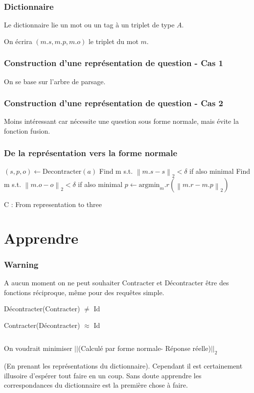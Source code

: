 \documentclass{beamer}
\newcommand{\N}[1]{\left\|#1\right\|_2}
\begin{document}
\begin{frame}
\frametitle{Dictionnaire}

\begin{defi}
Le dictionnaire lie un mot ou un tag à un triplet de type $A$.

On écrira $(m.s,m.p,m.o)$ le triplet du mot $m$.
\end{defi}
\end{frame}

\begin{frame}
\frametitle{Construction d'une représentation de question - Cas 1}
\parseroutput

On se base sur l'arbre de parsage.
\end{frame}

\begin{frame}
\frametitle{Construction d'une représentation de question - Cas 2}
\begin{center}
\synthesis
\end{center}

Moins intéressant car nécessite une question sous forme normale, mais évite la fonction fusion. 
\end{frame}

\begin{frame}
\frametitle{De la représentation vers la forme normale}
\begin{algorithm}[H]
\DontPrintSemicolon  %
$(s,p,o) \gets \text{Decontracter}(a)$\;
Find m s.t. $\N{m.s-s}<\delta$ if also minimal \;
Find m s.t. $\N{m.o-o}<\delta$ if also minimal \;
$p \gets \text{argmin}_m.r (\N{m.r-m.p})$\;
\;
\caption{ C : From representation to three}
\end{algorithm}

\end{frame}

\section{Apprendre}

\begin{frame}
\frametitle{Warning}
A aucun moment on ne peut souhaiter Contracter et Décontracter être des fonctions réciproque, même pour des requêtes simple.

Décontracter(Contracter) $\neq$ Id

Contracter(Décontracter) $\approx$ Id

$$ $$

On voudrait minimiser $||$(Calculé par forme normale- Réponse réelle)$||_2$ 

(En prenant les représentations du dictionnaire). Cependant il est certainement illusoire d'espérer tout faire en un coup. Sans doute apprendre les correspondances du dictionnaire est la première chose à faire.
\end{frame}
\end{document}

